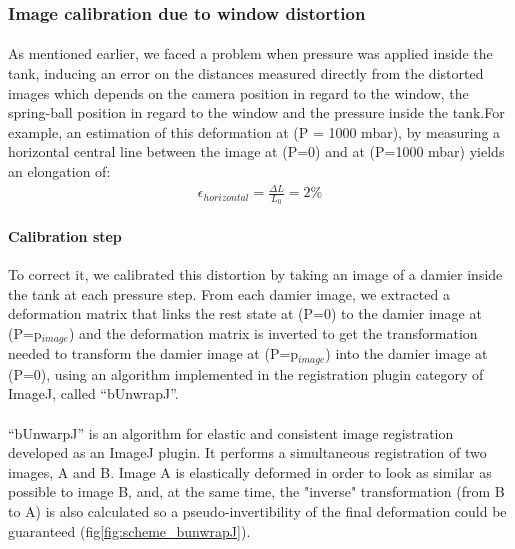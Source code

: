 \subsubsection{Image calibration due to window distortion}
\paragraph{}
As mentioned earlier, we faced a problem when pressure was applied inside the tank, inducing an error on the distances measured directly from the distorted images which depends on the camera position in regard to the window, the spring-ball position in regard to the window and the pressure inside the tank.For example, an estimation of this deformation at (P = 1000 mbar), by measuring a horizontal central line between the image at (P=0) and at (P=1000 mbar) yields an elongation of:
\begin{align}
	\epsilon_{horizontal} = \frac{\Delta L}{L_0} = 2\%
\end{align}
\paragraph{Calibration step} 
To correct it, we calibrated this distortion by taking an image of a damier inside the tank at each pressure step. 
 From each damier image, we extracted a deformation matrix that links the rest state at (P=0) to the damier image at (P=p$_{image}$) and the deformation matrix is inverted to get the transformation needed to transform the damier image at (P=p$_{image}$) into the damier image at (P=0), using an algorithm implemented in the registration plugin category of ImageJ, called "`bUnwrapJ"'.
\paragraph{}
"`bUnwarpJ"' is an algorithm for elastic and consistent image registration developed as an ImageJ plugin. It performs a simultaneous registration of two images, A and B. Image A is elastically deformed in order to look as similar as possible to image B, and, at the same time, the "inverse" transformation (from B to A) is also calculated so a pseudo-invertibility of the final deformation could be guaranteed (fig\ref{fig:scheme_bunwrapJ}).

